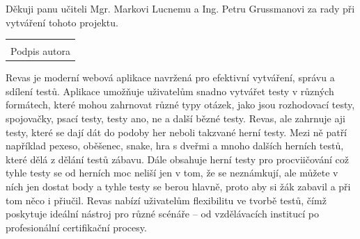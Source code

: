 \documentclass[12pt, a4paper, twoside, openright]{report}
\newcommand\datumOdevzdani{6. 1. 2025} %
\begin{document}
\cleardoublepage %
	
	\tableofcontents
	\cleardoublepage


	
	\noindent Děkuji panu učiteli Mgr. Markovi Lucnemu a Ing. Petru Grussmanovi za rady při vytváření tohoto projektu.
	
	\vspace*{0.7\textheight} %

	\vfill
	\noindent{V Opavě \datumOdevzdani\\}
	\noindent
	\begin{minipage}{\linewidth}
		\hspace{9.5cm} 
		\begin{tabular}{@{}p{6cm}@{}}
			\dotfill \\
			Podpis autora
		\end{tabular}
	\end{minipage}
	
	\cleardoublepage %

	Revas je moderní webová aplikace navržená pro efektivní vytváření, správu a sdílení testů. Aplikace umožňuje uživatelům snadno vytvářet testy v různých formátech, které mohou zahrnovat různé typy otázek, jako jsou rozhodovací testy, spojovačky, psací testy, testy ano, ne a další bězné testy. Revas, ale zahrnuje aji testy, které se dají dát do podoby her neboli takzvané herní testy. Mezi ně patří například pexeso, oběšenec, snake, hra s dveřmi a mnoho dalších herních testů, které dělá z dělání testů zábavu. Dále obsahuje herní testy pro procviičování což tyhle testy se od herních moc neliší jen v tom, že se neznámkují, ale můžete v ních jen dostat body a tyhle testy se berou hlavně, proto aby si žák zabavil a při tom něco i přiučil. Revas nabízí uživatelům flexibilitu ve tvorbě testů, čímž poskytuje ideální nástroj pro různé scénáře – od vzdělávacích institucí po profesionální certifikační procesy.
\end{document}

